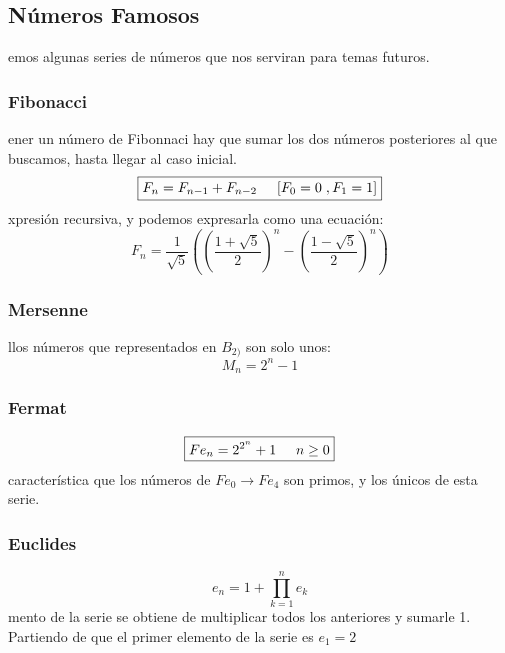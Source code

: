 \subsection{Números Famosos}
emos algunas series de números que nos serviran para temas futuros.
\subsubsection{Fibonacci}
ener un número de Fibonnaci hay que sumar los dos números posteriores al que buscamos, hasta llegar al caso inicial.
\[
        \boxed{F_n = F_{n-1} + F_{n-2} \hspace{5mm} \textnormal{[}F_0 = 0 \hspace{1mm}, F_1 = 1\textnormal{]}}
\]
xpresión recursiva, y podemos expresarla como una ecuación:
\[
        \boxed{F_n = \frac{1}{\sqrt{5}}\left ( \left ( \frac{1+\sqrt{5}}{2} \right )^n -\left ( \frac{1-\sqrt{5}}{2} \right )^n \right )}
\]
\subsubsection{Mersenne}
llos números que representados en \(B_{2)}\) son solo unos:
\[
        \boxed{M_n = 2^n - 1}
\]
\subsubsection{Fermat}
\[
        \boxed{Fe_n = 2^{2^n} +1 \hspace{5mm} n \geq 0}
\]
 característica que los números de \(Fe_0 \rightarrow Fe_4\) son primos, y los únicos de esta serie.
\subsubsection{Euclides}
\[
        \boxed{e_n = 1+ \prod^n_{k=1}e_k}
\]
mento de la serie se obtiene de multiplicar todos los anteriores y sumarle 1. Partiendo de que el primer elemento de la serie es \(e_1 = 2\)
